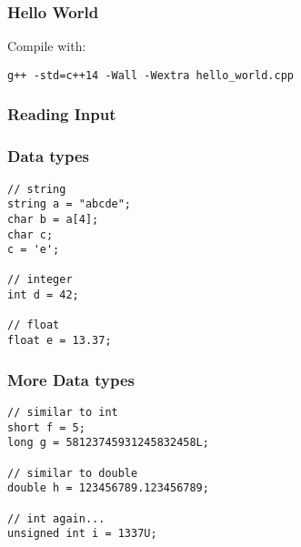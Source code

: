 \begin{frame}[fragile]
    \frametitle{Hello World}
    
    Compile with:
    \begin{lstlisting}[numbers=none]
g++ -std=c++14 -Wall -Wextra hello_world.cpp
    \end{lstlisting} %
\end{frame}

\begin{frame}[fragile]
    \frametitle{Reading Input}
    
\end{frame}

\begin{frame}[fragile]
    \frametitle{Data types}
\begin{lstlisting}
// string
string a = "abcde";
char b = a[4];
char c;
c = 'e';

// integer
int d = 42;

// float
float e = 13.37;
\end{lstlisting}
\end{frame}

\begin{frame}[fragile]
    \frametitle{More Data types}
\begin{lstlisting}
// similar to int
short f = 5;
long g = 58123745931245832458L;

// similar to double
double h = 123456789.123456789;

// int again...
unsigned int i = 1337U;
\end{lstlisting}
\end{frame}


